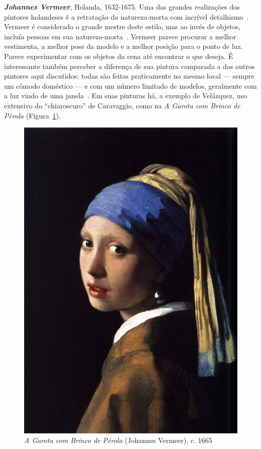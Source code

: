 \textbf{\emph{Johannes Vermeer}}, Holanda, 1632-1675. Uma das grandes realizações dos
pintores holandeses é a retratação da natureza-morta com incrível
detalhismo~\cite{wadum}. Vermeer é considerado o grande mestre deste
estilo, mas ao invés de objetos, incluía pessoas em sua
natureza-morta~\cite{gombrich}.  Vermeer parece procurar a melhor
vestimenta, a melhor pose da modelo e a melhor posição para o ponto de
luz. Parece experimentar com os objetos da cena até encontrar o que
deseja. É interessante também perceber a diferença de sua pintura
comparada a dos outros pintores aqui discutidos: todas são feitas
praticamente no mesmo local --- sempre um cômodo doméstico --- e com
um número limitado de modelos, geralmente com a luz vindo de uma
janela~\cite{wadum1998}.  Em suas pinturas há, a exemplo de Velázquez,
uso extensivo do ``chiaroscuro'' de Caravaggio, como na \textit{A
  Garota com Brinco de Pérola} (Figura~\ref{fig:vermeer:perola}).

\begin{figure}[ht!]
  \begin{center}
    \includegraphics[scale=1.3]{figs/vermeer_perola.png}
  \caption{\emph{A Garota com Brinco de Pérola} (Johannes Vermeer), c. 1665}
  \label{fig:vermeer:perola}
  \end{center}
\end{figure}

